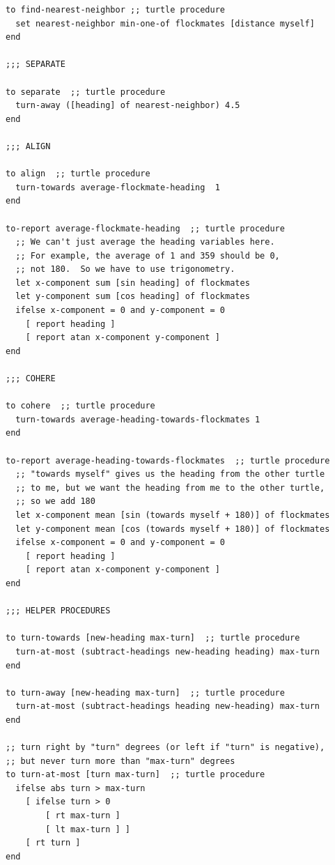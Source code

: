 \documentclass{article}
\begin{document}
\begin{lstlisting}
to find-nearest-neighbor ;; turtle procedure
  set nearest-neighbor min-one-of flockmates [distance myself]
end

;;; SEPARATE

to separate  ;; turtle procedure
  turn-away ([heading] of nearest-neighbor) 4.5
end

;;; ALIGN

to align  ;; turtle procedure
  turn-towards average-flockmate-heading  1
end

to-report average-flockmate-heading  ;; turtle procedure
  ;; We can't just average the heading variables here.
  ;; For example, the average of 1 and 359 should be 0,
  ;; not 180.  So we have to use trigonometry.
  let x-component sum [sin heading] of flockmates
  let y-component sum [cos heading] of flockmates
  ifelse x-component = 0 and y-component = 0
    [ report heading ]
    [ report atan x-component y-component ]
end

;;; COHERE

to cohere  ;; turtle procedure
  turn-towards average-heading-towards-flockmates 1
end

to-report average-heading-towards-flockmates  ;; turtle procedure
  ;; "towards myself" gives us the heading from the other turtle
  ;; to me, but we want the heading from me to the other turtle,
  ;; so we add 180
  let x-component mean [sin (towards myself + 180)] of flockmates
  let y-component mean [cos (towards myself + 180)] of flockmates
  ifelse x-component = 0 and y-component = 0
    [ report heading ]
    [ report atan x-component y-component ]
end

;;; HELPER PROCEDURES

to turn-towards [new-heading max-turn]  ;; turtle procedure
  turn-at-most (subtract-headings new-heading heading) max-turn
end

to turn-away [new-heading max-turn]  ;; turtle procedure
  turn-at-most (subtract-headings heading new-heading) max-turn
end

;; turn right by "turn" degrees (or left if "turn" is negative),
;; but never turn more than "max-turn" degrees
to turn-at-most [turn max-turn]  ;; turtle procedure
  ifelse abs turn > max-turn
    [ ifelse turn > 0
        [ rt max-turn ]
        [ lt max-turn ] ]
    [ rt turn ]
end


\end{lstlisting}
\end{document}
